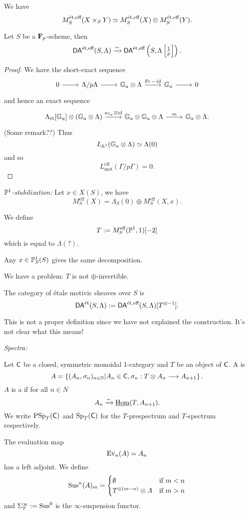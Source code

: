 We have
\[
M_S^{\text{\'et},\text{eff}}(X\times_S Y) \isoto M_S^{\text{\'et},\text{eff}}(X) \otimes M_S^{\text{\'et},\text{eff}}(Y).
\] 
\begin{proposition}
	Let $S$ be a $\F_p$-scheme, then
	\[
		\cat{DA}^{\text{\'et},\text{eff}}(S,\Lambda) \simto \cat{DA}^{\text{\'et},\text{eff}}\left( S,\Lambda\left[ \tfrac{1}{p} \right]  \right) .
	\] 
\end{proposition}
\begin{proof}
	We have the short-exact sequence
	\[
	\begin{tikzcd}
		0 \ar[r] & \Lambda / p\Lambda \ar[r] & \Ga \otimes \Lambda \ar[r,"\Fr-\id"] & \Ga \ar[r] & 0
	\end{tikzcd}
	\] 
	and hence an exact sequence
	\[
	\begin{tikzcd}
		\Lambda_{\text{\'et}}[\Ga] \otimes(\Ga\otimes \Lambda) \ar[r,"a_{\Ga}\otimes \id"] & \Ga\otimes \Ga\otimes \Lambda \ar[r,"m"] & \Ga\otimes \Lambda.
	\end{tikzcd}
	\] 
	(Some remark??) Thus
	\[
	L_{\Aff^{1}}(\Ga\otimes\Lambda) \isoto \Lambda(0)
	\] 
	and so
	\[
	L_{\text{mot}}^{\text{eff}}(\Gamma /p\Gamma) = 0.
	\]
\end{proof}

\emph{$\P^{1}$-stabilization:} Let $x\in X(S)$, we have
\[
M_S^{\text{eff}}(X) = \Lambda_S(0) \oplus M_{S}^{\text{eff}}(X,x).
\] 
\begin{definition}
	We define
	\[
		T \defeq M_S^{\text{eff}}(\P^{1},1)[-2]
	\] 
	which is equal to $\Lambda(?).$
\end{definition}
\begin{exercise}
	Any $x\in \P^{1}_S(S)$ gives the same decomposition.
\end{exercise}
We have a problem: $T$ is not $\oplus$-invertible.

\begin{definition}
	The category of \'etale motivic sheaves over $S$ is
	\[
		\DAet(S,\Lambda) \defeq \cat{DA}^{\text{\'et},\text{eff}}(S,\Lambda)[T^{\otimes -1}].
	\] 
\end{definition}
This is not a proper definition since we have not explained the construction. It's not clear what this means!

\emph{Spectra:}
\begin{definition}
	Let $\C$ be a closed, symmetric monoidal 1-category and $T$ be an object of $\C$. A  is
	\[
	A = \left\{ (A_n,\sigma_n)_{n\in \N} | A_n\in \C, \sigma_n:T\otimes A_n\to A_{n+1} \right\} .
	\] 
	$A$ is a  if for all $n\in N$ 
	\[
	A_n \simto \iHom(T,A_{n+1}).
	\] 
	We write $\PSp_T(\C)$ and $\Sp_T(\C)$ for the $T$-prespectrum and $T$-spectrum respectively.
\end{definition}
The evaluation map
\[
\Ev_n(A) = A_n
\] 
has a left adjoint. We define
\[
\Sus^{n}(A)_m = \begin{cases}
	\emptyset & \text{if }m<n \\
	T^{\otimes (m-n)}\otimes A & \text{if }m>n
\end{cases}
\] 
and $\Sigma_T^{\infty}\defeq \Sus^{0}$ is the $\infty$-suspension functor.


